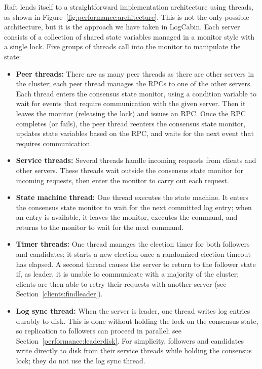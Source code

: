 Raft lends itself to a straightforward implementation architecture using
threads, as shown in Figure~\ref{fig:performance:architecture}. This is
not the only possible architecture, but it is the approach we have taken
in LogCabin. Each server consists of a collection of shared state
variables managed in a monitor style with a single lock.  Five groups of
threads call into the monitor to manipulate the state:
%
\begin{itemize}
%
\item \textbf{Peer threads:} 
%
There are as many peer threads as there are other servers in the
cluster; each peer thread manages the RPCs to one of the other servers.
Each thread enters the consensus state monitor, using a condition
variable to wait for events that require communication with the given
server. Then it leaves the monitor (releasing the lock) and issues an
RPC. Once the RPC completes (or fails), the peer thread reenters the
consensus state monitor, updates state variables based on the RPC, and
waits for the next event that requires communication.
%
\item \textbf{Service threads:}
%
Several threads handle incoming requests from clients and other servers.
These threads wait outside the consensus state monitor for incoming
requests, then enter the monitor to carry out each request.
%
\item \textbf{State machine thread:}
%
One thread executes the state machine. It enters the consensus state
monitor to wait for the next committed log entry; when an entry is
available, it leaves the monitor, executes the command, and returns to
the monitor to wait for the next command.
%
\item \textbf{Timer threads:}
%
One thread manages the election timer for both followers and candidates;
it starts a new election once a randomized election timeout has elapsed.
A second thread causes the server to return to the follower state if, as
leader, it is unable to communicate with a majority of the cluster;
clients are then able to retry their requests with another server (see
Section~\ref{clients:findleader}).
%
\item \textbf{Log sync thread:} When the server is leader, one thread
writes log entries durably to disk. This is done without holding the
lock on the consensus state, so replication to followers can proceed in
parallel; see Section~\ref{performance:leaderdisk}. For simplicity,
followers and candidates write directly to disk from their service
threads while holding the consensus lock; they do not use the log sync
thread.
%
\end{itemize}

